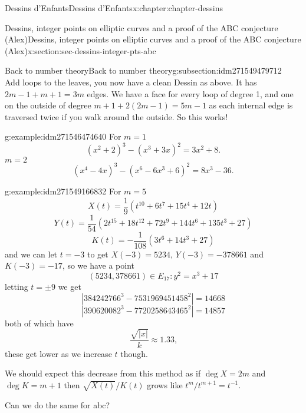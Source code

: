 \documentclass[oneside,10pt,]{book}
\numberwithin{equation}{section}
\newcommand{\inv}{^{-1}}
\begin{document}
\begin{chapterptx}{Dessins d'Enfants}{}{Dessins d'Enfants}{}{}{x:chapter:chapter-dessins}
\begin{sectionptx}{Dessins, integer points on elliptic curves and a proof of the ABC conjecture (Alex)}{}{Dessins, integer points on elliptic curves and a proof of the ABC conjecture (Alex)}{}{}{x:section:sec-dessins-integer-pts-abc}
\begin{subsectionptx}{Back to number theory}{}{Back to number theory}{}{}{g:subsection:idm271549479712}
\begin{equation*}
\end{equation*}
Add loops to the leaves, you now have a clean Dessin as above. It has \(2m- 1 + m + 1 = 3m\) edges. We have a face for every loop of degree 1, and one on the outside of degree \(m+ 1 +2(2m-1)  = 5m - 1\) as each internal edge is traversed twice if you walk around the outside. So this works!%
\begin{example}{}{g:example:idm271546474640}%
For \(m= 1\)%
\begin{equation*}
(x^2 + 2)^3 - (x^3 + 3x)^2 = 3x^2 + 8\text{.}
\end{equation*}
\(m= 2\)%
\begin{equation*}
(x^4 - 4x)^3 - (x^6 -6x^3+6)^2  = 8x^3 - 36\text{.}
\end{equation*}
%
\end{example}
\begin{example}{}{g:example:idm271549166832}%
For \(m =5\)%
\begin{equation*}
X(t) = \frac 19 (t^{10} + 6t^7 +15 t^4 + 12t)
\end{equation*}
%
\begin{equation*}
Y(t) = \frac{1}{54} (2t^{15} + 18t^{12} +72 t^9 + 144 t^6 + 135 t^3 + 27)
\end{equation*}
%
\begin{equation*}
K(t) = -\frac{1}{108} (3t^{6} + 14t^3 +27)
\end{equation*}
and we can let \(t = -3\) to get \(X(-3) = 5234\), \(Y(-3) = -378661\) and \(K(-3) = -17\), so we have a point%
\begin{equation*}
(5234, 378661) \in E_{17} \colon y^2 = x^3 + 17
\end{equation*}
letting \(t = \pm 9\) we get%
\begin{equation*}
|384242766^3 - 7531969451458^2| = 14668
\end{equation*}
%
\begin{equation*}
|390620082^3 - 7720258643465^2| = 14857
\end{equation*}
both of which have%
\begin{equation*}
\frac{\sqrt{|x|}}{k} \approx 1.33\text{,}
\end{equation*}
these get lower as we increase \(t\) though.%
\end{example}
We should expect this decrease from this method as if \(\deg X = 2m\) and \(\deg K = m + 1\) then \(\sqrt{X(t)}/K(t)\) grows like \(t^{m}/t^{m+1} = t\inv\).%
\par
Can we do the same for abc?%
\par

\end{subsectionptx}
\end{sectionptx}
\end{chapterptx}
\end{document}
